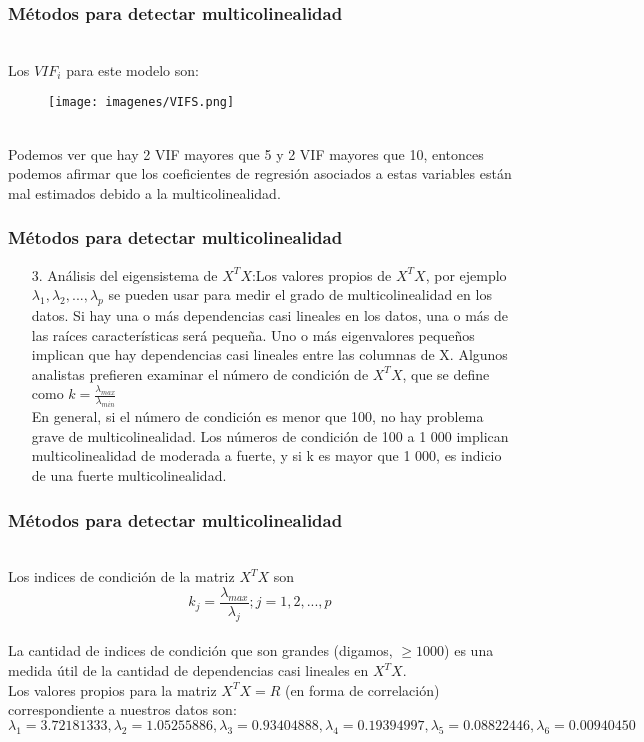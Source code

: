 \documentclass[12pt]{beamer}
\begin{document}
\begin{frame}
\frametitle{Métodos para detectar multicolinealidad}
~\\Los $VIF_{i}$ para este modelo son:
\begin{figure}[!h]
    \begin{center}
        \texttt{[image: imagenes/VIFS.png]}
        \label{fig:Densidad}
    \end{center}
\end{figure}
~\\Podemos ver que hay 2 VIF mayores que 5 y 2 VIF mayores que 10, entonces podemos afirmar que los coeficientes de regresión asociados a estas variables están mal estimados debido a la multicolinealidad.
\end{frame}

\begin{frame}
\frametitle{Métodos para detectar multicolinealidad}
\begin{itemize}
\item[3.]Análisis del eigensistema de $X^{T}X$:Los valores propios de $X^{T}X$, por ejemplo $\lambda_{1},\lambda_{2},...,\lambda_{p}$ se pueden usar para medir el grado de multicolinealidad en los datos. Si hay una o más dependencias casi lineales en los datos, una o más de las raíces características será pequeña. Uno o más eigenvalores pequeños implican que hay dependencias casi lineales entre las columnas de X. Algunos analistas prefieren examinar el número de condición de $X^{T}X$, que se define como $k=\frac{\lambda_{max}}{\lambda_{min}}$
~\\En general, si el número de condición es menor que 100, no hay problema grave de multicolinealidad. Los números de condición de 100 a 1 000 implican multicolinealidad de moderada a fuerte, y si k es mayor que 1 000, es indicio de una fuerte multicolinealidad.
\end{itemize}
\end{frame}

\begin{frame}
\frametitle{Métodos para detectar multicolinealidad}
~\\Los indices de condición de la matriz $X^{T}X$ son
~\\$$k_{j}=\frac{\lambda_{max}}{\lambda_{j}} ; j=1,2,...,p$$
~\\La cantidad de indices de condición que son grandes (digamos, $\geq 1000$) es una medida útil de la cantidad de dependencias casi lineales en $X^{T}X$.
~\\Los valores propios para la matriz $X^{T}X=R$ (en forma de correlación) correspondiente a nuestros datos son:
~\\$\lambda_{1}=3.72181333,\lambda_{2}=1.05255886,\lambda_{3}=0.93404888,\lambda_{4}=0.19394997,\lambda_{5}=0.08822446,\lambda_{6}=0.00940450$
\end{frame}
\end{document}
